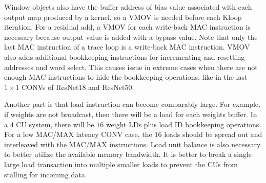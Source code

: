 \documentclass{sig-alternate}
\begin{document}





Window objects also have the buffer address of bias value associated with each output map produced by a kernel, so a VMOV is needed before each Kloop iteration. For a residual add, a VMOV for each write-back MAC instruction is necessary because output value is added with a bypass value. Note that only the last MAC instruction of a trace loop is a write-back MAC instruction. VMOV also adds additional bookkeeping instructions for incrementing and resetting addresses and word select. This causes issue in extreme cases when there are not enough MAC instructions to hide the bookkeeping operations, like in the last $1\times1$ CONVs of ResNet18 and ResNet50.

Another part is that load instruction can become comparably large. For example, if weights are not broadcast, then there will be a load for each weights buffer. In a $4$ CU system, there will be $16$ weight LDs plus load ID bookkeeping operations. For a low MAC/MAX latency CONV case, the $16$ loads should be spread out and interleaved with the MAC/MAX instructions. Load unit balance is also necessary to better utilize the available memory bandwidth. It is better to break a single large load transaction into multiple smaller loads to prevent the CUs from stalling for incoming data.
\end{document}
